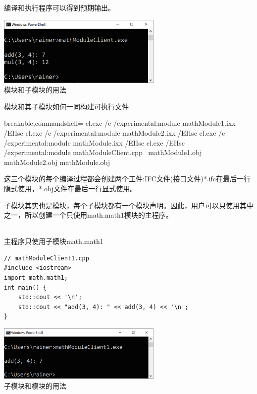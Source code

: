 编译和执行程序可以得到预期输出。

\begin{center}
\includegraphics[width=0.6\textwidth]{content/3/chapter4/images/21.png}\\
模块和子模块的用法
\end{center}

\begin{tcolorbox}[breakable,enhanced jigsaw,colback=blue!5!white,colframe=blue!75!black,title={使用Microsoft编译器构建可执行文件}]
	
模块和其子模块如何一同构建可执行文件

\begin{tcblisting}{breakable,commandshell={}}
cl.exe /c /experimental:module mathModule1.ixx /EHsc
cl.exe /c /experimental:module mathModule2.ixx /EHsc
cl.exe /c /experimental:module mathModule.ixx /EHsc
cl.exe /EHsc /experimental:module mathModuleClient.cpp \
  mathModule1.obj mathModule2.obj mathModule.obj
\end{tcblisting}

这三个模块的每个编译过程都会创建两个工件:IFC文件(接口文件)*.ifc在最后一行隐式使用，*.obj文件在最后一行显式使用。

\end{tcolorbox}

子模块其实也是模块，每个子模块都有一个模块声明。因此，用户可以只使用其中之一，所以创建一个只使用math.math1模块的主程序。

\hspace*{\fill} \\ %
\noindent
主程序只使用子模块math.math1
\begin{lstlisting}[style=styleCXX]
// mathModuleClient1.cpp
#include <iostream>
import math.math1;
int main() {
	std::cout << '\n';
	std::cout << "add(3, 4): " << add(3, 4) << '\n';
}
\end{lstlisting}

\begin{center}
\includegraphics[width=0.6\textwidth]{content/3/chapter4/images/22.png}\\
子模块和模块的用法
\end{center}

